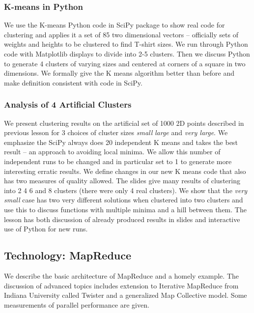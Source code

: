 \subsubsection{K-means in Python}\label{k-means-in-python}

We use the K-means Python code in SciPy package to show real code for
clustering and applies it a set of 85 two dimensional vectors --
officially sets of weights and heights to be clustered to find T-shirt
sizes. We run through Python code with Matplotlib displays to divide
into 2-5 clusters. Then we discuss Python to generate 4 clusters of
varying sizes and centered at corners of a square in two dimensions. We
formally give the K means algorithm better than before and make
definition consistent with code in SciPy.

\subsubsection{Analysis of 4 Artificial
Clusters}\label{analysis-of-4-artificial-clusters}

We present clustering results on the artificial set of 1000 2D points
described in previous lesson for 3 choices of cluster sizes \emph{small}
\emph{large} and \emph{very large}. We emphasize the SciPy always does
20 independent K means and takes the best result -- an approach to
avoiding local minima. We allow this number of independent runs to be
changed and in particular set to 1 to generate more interesting erratic
results. We define changes in our new K means code that also has two
measures of quality allowed. The slides give many results of clustering
into 2 4 6 and 8 clusters (there were only 4 real clusters). We show
that the \emph{very small} case has two very different solutions when
clustered into two clusters and use this to discuss functions with
multiple minima and a hill between them. The lesson has both discussion
of already produced results in slides and interactive use of Python for
new runs.

\subsection{Technology: MapReduce}\label{technology-mapreduce}

We describe the basic architecture of MapReduce and a homely example.
The discussion of advanced topics includes extension to Iterative
MapReduce from Indiana University called Twister and a generalized Map
Collective model. Some measurements of parallel performance are given.


